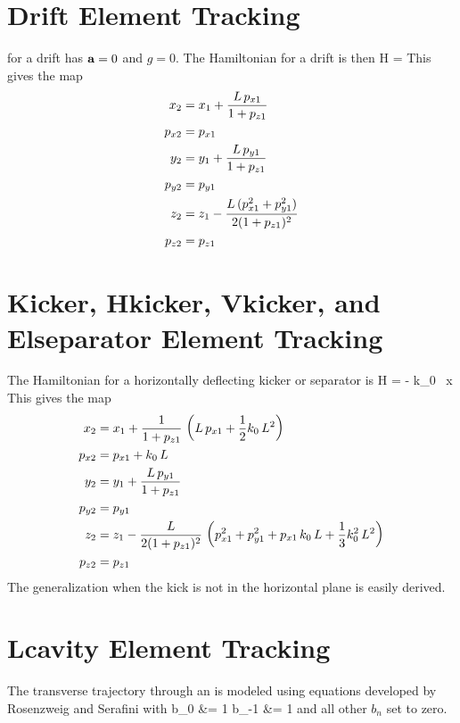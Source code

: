 \section{Drift Element Tracking}
\label{s:drift.std}

 for a drift has ${\bf a} = 0$ and $g = 0$. The Hamiltonian for a
drift is then
\Begineq
  H =  
\Endeq
This gives the map
\begin{align}
  x_2    &= x_1 + \frac{L \, p_{x1}}{1 + p_{z1}} \nonumber \\
  p_{x2} &= p_{x1}  \nonumber \\
  y_2    &= y_1 + \frac{L \, p_{y1}}{1 + p_{z1}} \nonumber \\
  p_{y2} &= p_{y1}  \\
  z_2    &= z_1 - \frac{L \, (p_{x1}^2 + p_{y1}^2)}{2 (1 + p_{z1})^2} \nonumber \\
  p_{z2} &= p_{z1} \nonumber
\end{align}

\section{Kicker, Hkicker, Vkicker, and Elseparator Element Tracking}
\label{s:kicker.std}

The Hamiltonian for a horizontally deflecting kicker or separator is
\Begineq
  H =  - k_0 \, x 
\Endeq
This gives the map
\begin{align}
  x_2    &= x_1 + \frac{1}{1 + p_{z1}} \, \left( L \, p_{x1} + \frac{1}{2} k_0 \, L^2 \right) \nonumber \\
  p_{x2} &= p_{x1} + k_0 \, L \nonumber \\
  y_2    &= y_1 + \frac{L \, p_{y1}}{1 + p_{z1}} \nonumber \\
  p_{y2} &= p_{y1}  \\
  z_2    &= z_1 - \frac{L}{2 (1 + p_{z1})^2} \, 
    \left( p_{x1}^2 + p_{y1}^2 + p_{x1} \, k_0 \, L + \frac{1}{3} k_0^2 \, L^2 \right) \nonumber \\
  p_{z2} &= p_{z1} \nonumber
\end{align}
The generalization when the kick is not in the horizontal plane is easily derived.

\section{Lcavity Element Tracking}
\label{s:lcavity.std}

The transverse trajectory through an  is modeled using equations
developed by Rosenzweig and Serafini\cite{b:rosenzweig} with
\Begineqs
  b_0 &= 1 \CRNO
  b_{-1} &= 1 
\Endeqs
and all other $b_n$ set to zero.

